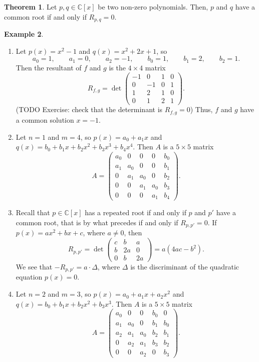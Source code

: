 \documentclass{article}
\newcommand{\C}{\mathbb{C}}
\newcommand{\rb}[1]{\left( #1 \right)}
\renewcommand{\sb}[1]{\left[ #1 \right]}
\theoremstyle{definition}\newtheorem{definition}{Definition}[section]
\theoremstyle{definition}\newtheorem{notation}[definition]{Notation}
\theoremstyle{definition}\newtheorem{remark}[definition]{Remark}
\theoremstyle{definition}\newtheorem{example}[definition]{Example}
\theoremstyle{definition}\newtheorem{fact}{Fact}
\theoremstyle{definition}\newtheorem{exercise}{Exercise}
\newtheorem{theorem}[definition]{Theorem}
\begin{document}
\begin{theorem}
\label{thm:9.3}
Let $ p, q \in \C\sb{x} $ be two non-zero polynomials. Then, $ p $ and $ q $ have a common root if and only if $ R_{p, q} = 0 $.
\end{theorem}

\begin{example}
\hfill
\begin{enumerate}
\item Let $ p\rb{x} = x^2 - 1 $ and $ q\rb{x} = x^2 + 2x + 1 $, so
$$ a_0 = 1, \qquad a_1 = 0, \qquad a_2 = -1, \qquad b_0 = 1, \qquad b_1 = 2, \qquad b_2 = 1. $$
Then the resultant of $ f $ and $ g $ is the $ 4 \times 4 $ matrix
$$ R_{f, g} = \det\begin{pmatrix} -1 & 0 & 1 & 0 \\ 0 & -1 & 0 & 1 \\ 1 & 2 & 1 & 0 \\ 0 & 1 & 2 & 1 \end{pmatrix}. $$
(TODO Exercise: check that the determinant is $ R_{f, g} = 0 $) Thus, $ f $ and $ g $ have a common solution $ x = -1 $.
\item Let $ n = 1 $ and $ m = 4 $, so $ p\rb{x} = a_0 + a_1x $ and $ q\rb{x} = b_0 + b_1x + b_2x^2 + b_3x^3 + b_4x^4 $. Then $ A $ is a $ 5 \times 5 $ matrix
$$ A = \begin{pmatrix} a_0 & 0 & 0 & 0 & b_0 \\ a_1 & a_0 & 0 & 0 & b_1 \\ 0 & a_1 & a_0 & 0 & b_2 \\ 0 & 0 & a_1 & a_0 & b_3 \\ 0 & 0 & 0 & a_1 & b_4 \end{pmatrix}. $$
\item Recall that $ p \in \C\sb{x} $ has a repeated root if and only if $ p $ and $ p' $ have a common root, that is by what precedes if and only if $ R_{p, p'} = 0 $. If $ p\rb{x} = ax^2 + bx + c $, where $ a \ne 0 $, then
$$ R_{p, p'} = \det\begin{pmatrix} c & b & a \\ b & 2a & 0 \\ 0 & b & 2a \end{pmatrix} = a\rb{4ac - b^2}. $$
We see that $ -R_{p, p'} = a \cdot \Delta $, where $ \Delta $ is the discriminant of the quadratic equation $ p\rb{x} = 0 $.
\item Let $ n = 2 $ and $ m = 3 $, so $ p\rb{x} = a_0 + a_1x + a_2x^2 $ and $ q\rb{x} = b_0 + b_1x + b_2x^2 + b_3x^3 $. Then $ A $ is a $ 5 \times 5 $ matrix
$$ A = \begin{pmatrix} a_0 & 0 & 0 & b_0 & 0 \\ a_1 & a_0 & 0 & b_1 & b_0 \\ a_2 & a_1 & a_0 & b_2 & b_1 \\ 0 & a_2 & a_1 & b_3 & b_2 \\ 0 & 0 & a_2 & 0 & b_3 \end{pmatrix}. $$
\end{enumerate}
\end{example}
\end{document}
